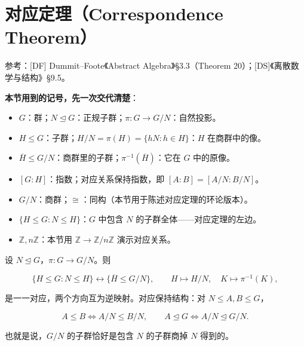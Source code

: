 \section{对应定理（Correspondence Theorem）}


参考：[DF] Dummit–Foote《Abstract Algebra》§3.3（Theorem 20）；[DS]《离散数学与结构》§9.5。

\textbf{本节用到的记号，先一次交代清楚}：

\begin{itemize}
\item $G$：群；$N\trianglelefteq G$：正规子群；$\pi:G\to G/N$：自然投影。
\item $H\le G$：子群；$H/N=\pi(H)=\{hN:h\in H\}$：$H$ 在商群中的像。
\item $\overline{H}\le G/N$：商群里的子群；$\pi^{-1}(\overline{H})$：它在 $G$ 中的原像。
\item $[G:H]$：指数；对应关系保持指数，即 $[A:B]=[A/N:B/N]$。
\item $G/N$：商群；$\cong$：同构（本节用于陈述对应定理的环论版本）。
\item $\{H\le G:N\le H\}$：$G$ 中包含 $N$ 的子群全体——对应定理的左边。
\item $\mathbb Z,n\mathbb Z$：本节用 $\mathbb Z\to\mathbb Z/n\mathbb Z$ 演示对应关系。
\end{itemize}


设 $N\trianglelefteq G$，$\pi:G\to G/N$。则

\[\{H\le G:N\le H\}\longleftrightarrow\{\overline H\le G/N\},\qquad H\longmapsto H/N,\quad K\longmapsto\pi^{-1}(K),\]

是一一对应，两个方向互为逆映射。对应保持结构：对 $N\le A,B\le G$，

\[A\le B\iff A/N\le B/N,\qquad A\trianglelefteq G\iff A/N\trianglelefteq G/N.\]

也就是说，$G/N$ 的子群恰好是包含 $N$ 的子群商掉 $N$ 得到的。
